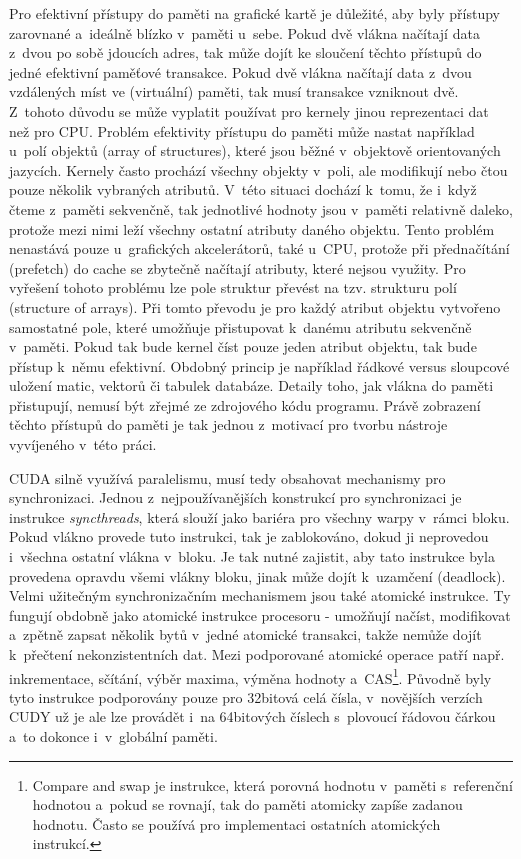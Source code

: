 Pro efektivní přístupy do paměti na grafické kartě je důležité, aby byly přístupy zarovnané a~ideálně blízko v~paměti u~sebe. Pokud dvě vlákna načítají data z~dvou po sobě jdoucích adres, tak může dojít ke sloučení těchto přístupů do jedné efektivní paměťové transakce. Pokud dvě vlákna načítají data z~dvou vzdálených míst ve (virtuální) paměti, tak musí transakce vzniknout dvě. Z~tohoto důvodu se může vyplatit používat pro kernely jinou reprezentaci dat než pro CPU. Problém efektivity přístupu do paměti může nastat například u~polí objektů (array of structures), které jsou běžné v~objektově orientovaných jazycích. Kernely často prochází všechny objekty v~poli, ale modifikují nebo čtou pouze několik vybraných atributů. V~této situaci dochází k~tomu, že i~když čteme z~paměti sekvenčně, tak jednotlivé hodnoty jsou v~paměti relativně daleko, protože mezi nimi leží všechny ostatní atributy daného objektu. Tento problém nenastává pouze u~grafických akcelerátorů, také u~CPU, protože při přednačítání (prefetch) do cache se zbytečně načítají atributy, které nejsou využity. Pro vyřešení tohoto problému lze pole struktur převést na tzv. strukturu polí (structure of arrays). Při tomto převodu je pro každý atribut objektu vytvořeno samostatné pole, které umožňuje přistupovat k~danému atributu sekvenčně v~paměti. Pokud tak bude kernel číst pouze jeden atribut objektu, tak bude přístup k~němu efektivní. Obdobný princip je například řádkové versus sloupcové uložení matic, vektorů či tabulek databáze. Detaily toho, jak vlákna do paměti přistupují, nemusí být zřejmé ze zdrojového kódu programu. Právě zobrazení těchto přístupů do paměti je tak jednou z~motivací pro tvorbu nástroje vyvíjeného v~této práci.

CUDA silně využívá paralelismu, musí tedy obsahovat mechanismy pro synchronizaci. Jednou z~nejpoužívanějších konstrukcí pro synchronizaci je instrukce \emph{syncthreads}, která slouží jako bariéra pro všechny warpy v~rámci bloku. Pokud vlákno provede tuto instrukci, tak je zablokováno, dokud ji neprovedou i~všechna ostatní vlákna v~bloku. Je tak nutné zajistit, aby tato instrukce byla provedena opravdu všemi vlákny bloku, jinak může dojít k~uzamčení (deadlock). Velmi užitečným synchronizačním mechanismem jsou také atomické instrukce. Ty fungují obdobně jako atomické instrukce procesoru - umožňují načíst, modifikovat a~zpětně zapsat několik bytů v~jedné atomické transakci, takže nemůže dojít k~přečtení nekonzistentních dat. Mezi podporované atomické operace patří např. inkrementace, sčítání, výběr maxima, výměna hodnoty a~CAS\footnote{Compare and swap je instrukce, která porovná hodnotu v~paměti s~referenční hodnotou a~pokud se rovnají, tak do paměti atomicky zapíše zadanou hodnotu. Často se používá pro implementaci ostatních atomických instrukcí.}. Původně byly tyto instrukce podporovány pouze pro 32bitová celá čísla, v~novějších verzích CUDY už je ale lze provádět i~na 64bitových číslech s~plovoucí řádovou čárkou a~to dokonce i~v~globální paměti.


